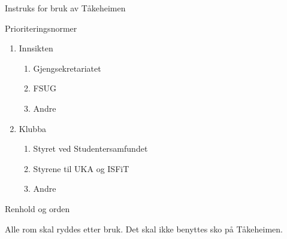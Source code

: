 \documentclass[../../fsbok.tex]{subfiles}
\begin{document}
\begin{instruks}{Instruks for bruk av Tåkeheimen}{}{}
    \begin{instruksledd}{Prioriteringsnormer}
	\begin{enumerate}
		\item Innsikten
			\begin{enumerate}
				\item Gjengsekretariatet
				\item FSUG
				\item Andre
			\end{enumerate}
		\item Klubba
			\begin{enumerate}
				\item Styret ved Studentersamfundet
				\item Styrene til UKA og ISFiT
				\item Andre
			\end{enumerate}
	\end{enumerate}
    \end{instruksledd}

    \begin{instruksledd}{Renhold og orden}
	

		Alle rom skal ryddes etter bruk. Det skal ikke benyttes sko på Tåkeheimen.

	

    \end{instruksledd}
	
\end{instruks}
\end{document}
